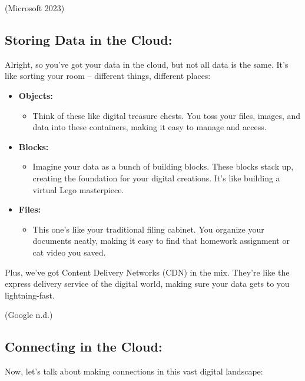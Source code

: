 \documentclass[
  letterpaper,
  DIV=11,
  numbers=noendperiod]{scrreprt}
\providecommand{\tightlist}{%
  \setlength{\itemsep}{0pt}\setlength{\parskip}{0pt}}\usepackage{longtable,booktabs,array}
\begin{document}
(Microsoft 2023)

\subsection{Storing Data in the Cloud:}\label{storing-data-in-the-cloud}

Alright, so you've got your data in the cloud, but not all data is the
same. It's like sorting your room -- different things, different places:

\begin{itemize}
\item
  \textbf{Objects:}

  \begin{itemize}
  \tightlist
  \item
    Think of these like digital treasure chests. You toss your files,
    images, and data into these containers, making it easy to manage and
    access.
  \end{itemize}
\item
  \textbf{Blocks:}

  \begin{itemize}
  \tightlist
  \item
    Imagine your data as a bunch of building blocks. These blocks stack
    up, creating the foundation for your digital creations. It's like
    building a virtual Lego masterpiece.
  \end{itemize}
\item
  \textbf{Files:}

  \begin{itemize}
  \tightlist
  \item
    This one's like your traditional filing cabinet. You organize your
    documents neatly, making it easy to find that homework assignment or
    cat video you saved.
  \end{itemize}
\end{itemize}

Plus, we've got Content Delivery Networks (CDN) in the mix. They're like
the express delivery service of the digital world, making sure your data
gets to you lightning-fast.

(Google n.d.)

\subsection{Connecting in the Cloud:}\label{connecting-in-the-cloud}

Now, let's talk about making connections in this vast digital landscape:
\end{document}
